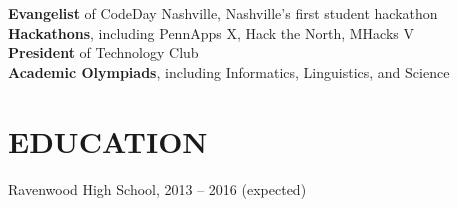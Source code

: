 \documentclass{res}
\begin{document}
\textbf{Evangelist} of CodeDay Nashville, Nashville's first student hackathon \\[1mm]
\textbf{Hackathons}, including PennApps X, Hack the North, MHacks V \\[1mm]
\textbf{President} of Technology Club \\[1mm]
\textbf{Academic Olympiads}, including Informatics, Linguistics, and Science

\section{EDUCATION}

Ravenwood High School, 2013 -- 2016 {(expected)}
\end{document}
